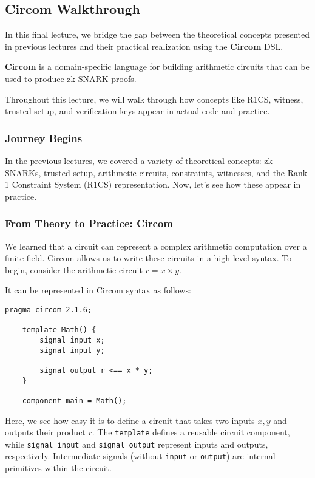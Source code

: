 \documentclass[../lecture-notes.tex]{subfiles}
\begin{document}
    \subsection{Circom Walkthrough}

    In this final lecture, we bridge the gap between the theoretical concepts presented in previous lectures and their practical realization using the \textbf{Circom} DSL.

    \begin{definition}
        \textbf{Circom} is a domain-specific language for building arithmetic circuits that can be used to produce zk-SNARK proofs.
    \end{definition}

    Throughout this lecture, we will walk through how concepts like R1CS, witness, trusted setup, and verification keys appear in actual code and practice.

    \subsubsection{Journey Begins}

    In the previous lectures, we covered a variety of theoretical concepts: zk-SNARKs, trusted setup, arithmetic circuits, constraints, witnesses, and the Rank-1 Constraint System (R1CS) representation.
    Now, let's see how these appear in practice.

    \subsubsection{From Theory to Practice: Circom}

    We learned that a circuit can represent a complex arithmetic computation over a finite field.
    Circom allows us to write these circuits in a high-level syntax.
    To begin, consider the arithmetic circuit $r = x \times y$.

    It can be represented in Circom syntax as follows:

    \begin{lstlisting}[language=Circom]
    pragma circom 2.1.6;

    template Math() {
        signal input x;
        signal input y;

        signal output r <== x * y;
    }

    component main = Math();
    \end{lstlisting}

    Here, we see how easy it is to define a circuit that takes two inputs $x,y$ and outputs their product $r$.
    The \texttt{template} defines a reusable circuit component, while \texttt{signal input} and \texttt{signal output} represent inputs and outputs, respectively.
    Intermediate signals (without \texttt{input} or \texttt{output}) are internal primitives within the circuit.
\end{document}
